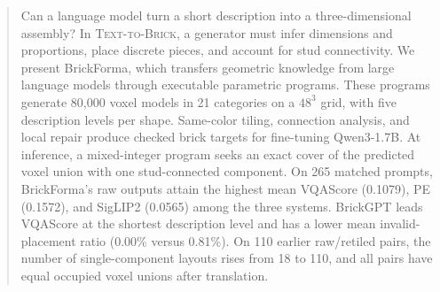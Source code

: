 \begin{abstract}
Can a language model turn a short description into a three-dimensional assembly? In \textsc{Text-to-Brick}, a generator must infer dimensions and proportions, place discrete pieces, and account for stud connectivity. We present BrickForma, which transfers geometric knowledge from large language models through executable parametric programs. These programs generate 80,000 voxel models in 21 categories on a $48^3$ grid, with five description levels per shape. Same-color tiling, connection analysis, and local repair produce checked brick targets for fine-tuning Qwen3-1.7B. At inference, a mixed-integer program seeks an exact cover of the predicted voxel union with one stud-connected component. On 265 matched prompts, BrickForma's raw outputs attain the highest mean VQAScore (0.1079), PE (0.1572), and SigLIP2 (0.0565) among the three systems. BrickGPT leads VQAScore at the shortest description level and has a lower mean invalid-placement ratio (0.00\% versus 0.81\%). On 110 earlier raw/retiled pairs, the number of single-component layouts rises from 18 to 110, and all pairs have equal occupied voxel unions after translation.
\end{abstract}
